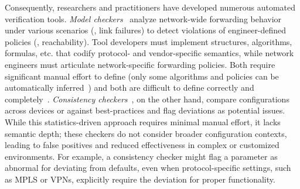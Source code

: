 Consequently, researchers and practitioners have developed numerous automated verification tools.
{\em Model checkers}~\cite{fogel2015general, beckett2017general, abhashkumar2020tiramisu, prabhu2020plankton, zhang2022sre, steffen2020netdice, ye2020hoyan, ritchey2000using,al2011configchecker, jeffrey2009model, batfish} analyze network-wide forwarding behavior under various scenarios (\eg, link failures) to detect violations of engineer-defined policies (\eg, reachability). Tool developers must implement structures, algorithms, formulas, etc. that codify protocol- and vendor-specific semantics, while network engineers must articulate network-specific forwarding policies. Both require significant manual effort to define (only some algorithms and policies can be automatically inferred~\cite{birkner2020config2spec, kheradmand2020anime, sharma2023prosper}) and both are difficult to define correctly and completely~\cite{ye2020hoyan, birkner2021metha}.
{\em Consistency checkers}~\cite{kakarla2024diffy,kakarla2020finding, le2006minerals, feamster2005detecting, tang2021campion, le2008detecting, le2006characterization, batfish}, on the other hand, compare configurations across devices or against best-practices and flag deviations as potential issues.
While this statistics-driven approach requires minimal manual effort, it lacks semantic depth; these checkers 
do not consider broader configuration contexts, leading to false positives and reduced effectiveness in complex or customized environments.
For example, a consistency checker might flag a parameter as abnormal for deviating from defaults, even when protocol-specific settings, such as MPLS or VPNs, explicitly require the deviation for proper functionality.

